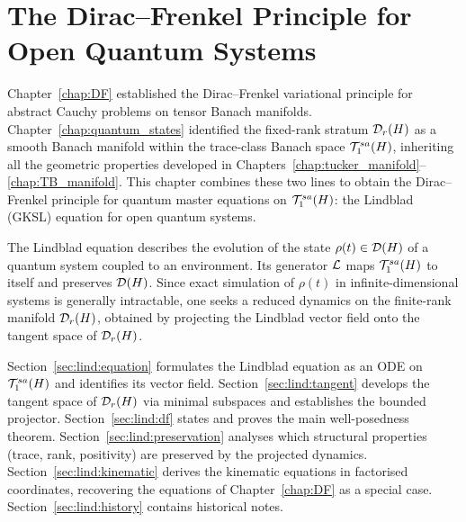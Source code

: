 %
%

\chapter{The Dirac--Frenkel Principle for Open Quantum Systems}
\label{chap:lindblad}

Chapter~\ref{chap:DF} established the Dirac--Frenkel variational
principle for abstract Cauchy problems on tensor Banach manifolds.
Chapter~\ref{chap:quantum_states} identified the fixed-rank stratum
$\mathcal{D}_{r}(H)$ as a smooth Banach manifold within the trace-class
Banach space $\mathcal{T}_{1}^{sa}(H)$, inheriting all the geometric properties
developed in Chapters~\ref{chap:tucker_manifold}--\ref{chap:TB_manifold}.
This chapter combines these two lines to obtain the Dirac--Frenkel
principle for quantum master equations on $\mathcal{T}_{1}^{sa}(H)$: the Lindblad
(GKSL) equation for open quantum systems.

The Lindblad equation describes the evolution of the state $\rho(t)
\in \mathcal{D}(H)$ of a quantum system coupled to an environment. Its
generator $\mathcal{L}$ maps $\mathcal{T}_{1}^{sa}(H)$ to itself and preserves
$\mathcal{D}(H)$. Since exact simulation of $\rho(t)$ in
infinite-dimensional systems is generally intractable, one seeks a
reduced dynamics on the finite-rank manifold $\mathcal{D}_{r}(H)$,
obtained by projecting the Lindblad vector field onto the tangent space
of $\mathcal{D}_{r}(H)$.

Section~\ref{sec:lind:equation} formulates the Lindblad equation as an
ODE on $\mathcal{T}_{1}^{sa}(H)$ and identifies its vector field.
Section~\ref{sec:lind:tangent} develops the tangent space of $\mathcal{D}_{r}(H)$
via minimal subspaces and establishes the bounded projector.
Section~\ref{sec:lind:df} states and proves the main well-posedness theorem.
Section~\ref{sec:lind:preservation} analyses which structural properties
(trace, rank, positivity) are preserved by the projected dynamics.
Section~\ref{sec:lind:kinematic} derives the kinematic equations in
factorised coordinates, recovering the equations of Chapter~\ref{chap:DF}
as a special case.
Section~\ref{sec:lind:history} contains historical notes.

